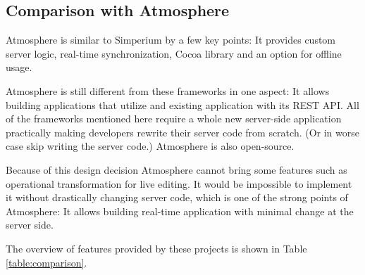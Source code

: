\subsection{Comparison with Atmosphere}


\tabcolsep=10pt
\begin{table}[!hb]
  \centering
  \caption{Comparison of solutions similar to Atmosphere}
  \label{table:comparison}
\end{table}


Atmosphere is similar to Simperium by a few key points: It provides custom server logic, real-time synchronization, Cocoa library and an option for offline usage.

Atmosphere is still different from these frameworks in one aspect: It allows building applications that utilize and existing application with its REST API. All of the frameworks mentioned here require a whole new server-side application practically making developers rewrite their server code from scratch. (Or in worse case skip writing the server code.) Atmosphere is also open-source.

Because of this design decision Atmosphere cannot bring some features such as operational transformation for live editing. It would be impossible to implement it without drastically changing server code, which is one of the strong points of Atmosphere: It allows building real-time application with minimal change at the server side.

The overview of features provided by these projects is shown in Table \ref{table:comparison}.